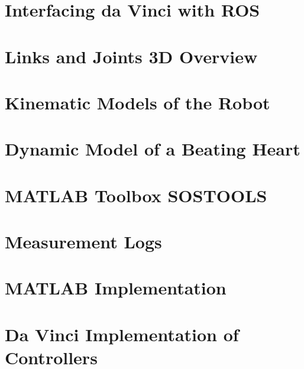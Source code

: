 \begin{appendices}
\appendix
\renewcommand{\appendixname}{Appendix}
\renewcommand{\appendixtocname}{Appendix}

\label{appendixbegin}

\chapter{Interfacing da Vinci with ROS}\label{app:ros}


\chapter{Links and Joints 3D Overview}\label{app:links_joints_3d}


\chapter{Kinematic Models of the Robot}\label{app:kinematic_model_robot}


\chapter{Dynamic Model of a Beating Heart}\label{app:dynamic_model_heart}


\chapter{MATLAB Toolbox SOSTOOLS}\label{app:sostools}


\chapter{Measurement Logs}\label{app:meas}


\chapter{MATLAB Implementation}\label{app:slide_implement_1}



\chapter{Da Vinci Implementation of Controllers}\label{app:slide_implement_2}



\end{appendices}
